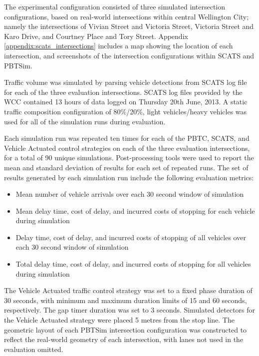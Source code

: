 The experimental configuration consisted of three simulated intersection configurations, based on real-world intersections within central Wellington City; namely the intersections of Vivian Street and Victoria Street, Victoria Street and Karo Drive, and Courtney Place and Tory Street. Appendix \ref{appendix:scats_intersections} includes a map showing the location of each intersection, and screenshots of the intersection configurations within SCATS and PBTSim. 

Traffic volume was simulated by parsing vehicle detections from SCATS log file for each of the three evaluation intersections. SCATS log files provided by the WCC contained 13 hours of data logged on Thursday 20th June, 2013. A static traffic composition configuration of 80\%/20\%, light vehicles/heavy vehicles was used for all of the simulation runs during evaluation.

Each simulation run was repeated ten times for each of the PBTC, SCATS, and Vehicle Actuated control strategies on each of the three evaluation intersections, for a total of 90 unique simulations. Post-processing tools were used to report the mean and standard deviation of results for each set of repeated runs. The set of results generated by each simulation run include the following evaluation metrics:

\begin{itemize}
\item Mean number of vehicle arrivals over each 30 second window of simulation
\item Mean delay time, cost of delay, and incurred costs of stopping for each vehicle during simulation
\item Delay time, cost of delay, and incurred costs of stopping of all vehicles over each 30 second window of simulation
\item Total delay time, cost of delay, and incurred costs of stopping for all vehicles during simulation
\end{itemize}

The Vehicle Actuated traffic control strategy was set to a fixed phase duration of 30 seconds, with minimum and maximum duration limits of 15 and 60 seconds, respectively. The gap timer duration was set to 3 seconds. Simulated detectors for the Vehicle Actuated strategy were placed 5 metres from the stop line. The geometric layout of each PBTSim intersection configuration was constructed to reflect the real-world geometry of each intersection, with lanes not used in the evaluation omitted. 

